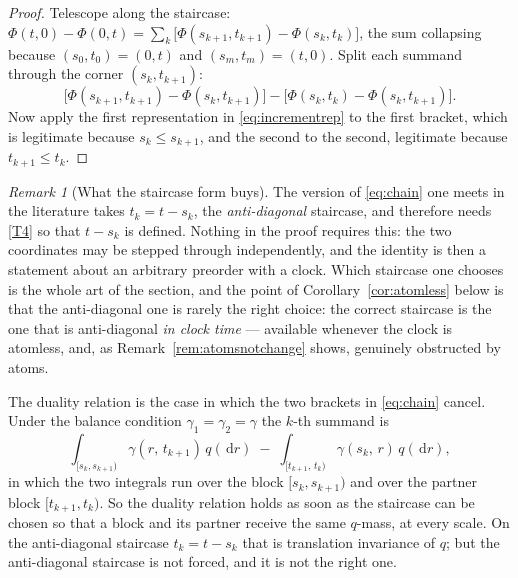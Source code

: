 \documentclass[11pt,a4paper]{article}
\theoremstyle{plain}
\theoremstyle{definition}
\theoremstyle{remark}
\newtheorem{remark}[theorem]{Remark}
\newcommand{\dif}{\,\mathrm{d}}
\begin{document}
\begin{proof}
  Telescope along the staircase:
  $\Phi(t,0) - \Phi(0,t)
    = \sum_{k} \bigl[ \Phi(s_{k+1}, t_{k+1}) - \Phi(s_k, t_k) \bigr]$, the sum
  collapsing because $(s_0,t_0) = (0,t)$ and $(s_m,t_m) = (t,0)$.  Split each
  summand through the corner $(s_k, t_{k+1})$:
  \[
    \bigl[ \Phi(s_{k+1},t_{k+1}) - \Phi(s_k,t_{k+1}) \bigr]
    - \bigl[ \Phi(s_k,t_k) - \Phi(s_k,t_{k+1}) \bigr] .
  \]
  Now apply the first representation in \eqref{eq:incrementrep} to the first
  bracket, which is legitimate because $s_k \leq s_{k+1}$, and the second to the
  second, legitimate because $t_{k+1} \leq t_k$.
\end{proof}

\begin{remark}[What the staircase form buys]
  \label{rem:staircase}
  The version of \eqref{eq:chain} one meets in the literature takes
  $t_k = t - s_k$, the \emph{anti-diagonal} staircase, and therefore needs \eqref{T4}
  so that $t - s_k$ is defined.  Nothing in the proof requires this: the two
  coordinates may be stepped through independently, and the identity is then a
  statement about an arbitrary preorder with a clock.  Which staircase one
  chooses is the whole art of the section, and the point of
Corollary~\ref{cor:atomless} below is that the anti-diagonal one is rarely the
  right choice: the correct staircase is the one that is anti-diagonal \emph{in
  clock time} --- available whenever the clock is atomless, and, as
  Remark~\ref{rem:atomsnotchange} shows, genuinely obstructed by atoms.
\end{remark}

The duality relation is the case in which the two brackets in \eqref{eq:chain}
cancel.  Under the balance condition $\gamma_1 = \gamma_2 = \gamma$ the $k$-th
summand is
\begin{equation}
  \label{eq:cancel}
  \int_{[s_k,s_{k+1})} \gamma(r,\, t_{k+1}) \, q(\dif r)
  \;-\;
  \int_{[t_{k+1},\,t_k)} \gamma(s_k,\, r) \, q(\dif r) ,
\end{equation}
in which the two integrals run over the block $[s_k,s_{k+1})$ and over the
partner block $[t_{k+1},t_k)$.  So the duality relation holds as soon as the
staircase can be chosen so that a block and its partner receive the same
$q$-mass, at every scale.  On the anti-diagonal staircase $t_k = t - s_k$ that is
translation invariance of $q$; but the anti-diagonal staircase is not forced, and
it is not the right one.
\end{document}
